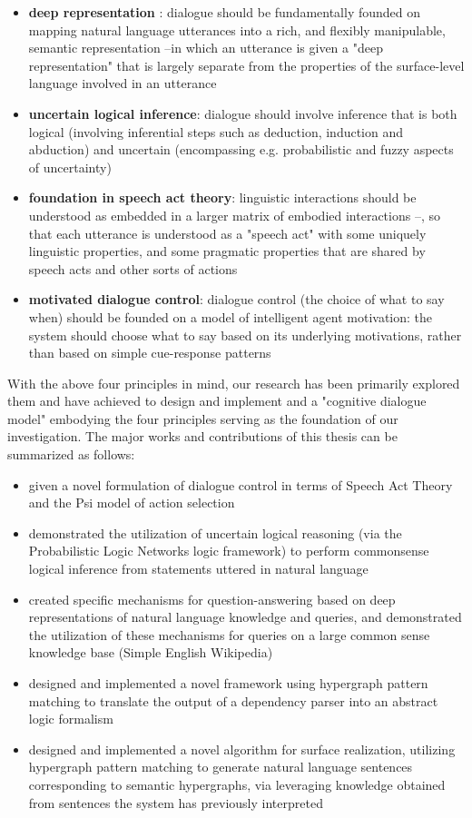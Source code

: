 \begin{englishabstract}
\begin{itemize}
\item {\bf deep representation }: dialogue should be fundamentally founded on mapping natural language utterances into a rich, and flexibly manipulable, semantic representation --in which an utterance is given a "deep representation" that is largely separate from the properties of the surface-level language involved in an utterance
\item {\bf uncertain logical inference}: dialogue should involve inference that is both logical (involving inferential steps such as deduction, induction and abduction) and uncertain (encompassing e.g. probabilistic and fuzzy aspects of uncertainty)
\item {\bf foundation in speech act theory}: linguistic interactions should be understood as embedded in a larger matrix of embodied interactions --, so that each utterance is understood as a "speech act" with some uniquely linguistic properties, and some pragmatic properties that are shared by speech acts and other sorts of actions
\item {\bf motivated dialogue control}:  dialogue control (the choice of what to say when) should be founded on a model of intelligent agent motivation: the system should choose what to say based on its underlying motivations, rather than based on simple cue-response patterns
\end{itemize} 

With the above four principles in mind, our research has been primarily explored them and have achieved to design and implement and a "cognitive dialogue model" embodying the four principles serving as the foundation of our investigation. The major works and contributions of this thesis can be summarized as follows:

\begin{itemize}
\item given a novel formulation of dialogue control in terms of Speech Act Theory and the Psi model of action selection
\item demonstrated the utilization of uncertain logical reasoning (via the Probabilistic Logic Networks logic framework) to perform commonsense logical inference from statements uttered in natural language
\item created specific  mechanisms for question-answering based on deep representations of natural language knowledge and queries, and demonstrated the utilization of these mechanisms for queries on a large common sense knowledge base (Simple English Wikipedia)
\item designed and implemented a novel framework using hypergraph pattern matching to translate the output of a dependency parser into an abstract logic formalism
\item designed and implemented a novel algorithm for surface realization, utilizing hypergraph pattern matching to generate natural language sentences corresponding to semantic hypergraphs, via leveraging knowledge obtained from sentences the system has previously interpreted
\end{itemize}


\end{englishabstract}

